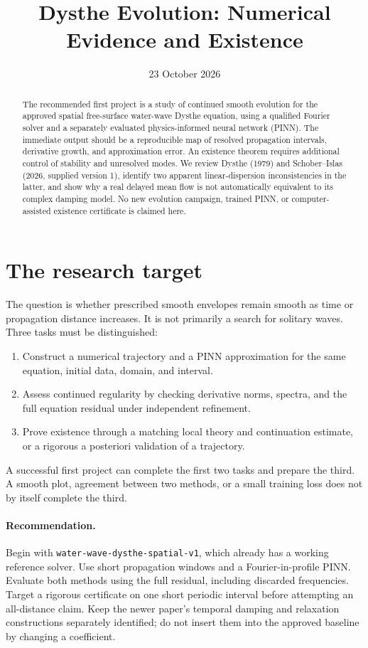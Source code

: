 \documentclass[11pt]{article}
\title{Dysthe Evolution: Numerical Evidence and Existence}
\author{}
\date{23 October 2026}
\begin{document}
\maketitle
\begin{abstract}
The recommended first project is a study of continued smooth evolution
for the approved spatial free-surface water-wave Dysthe equation, using
a qualified Fourier solver and a separately evaluated physics-informed
neural network (PINN). The immediate output should be a reproducible map
of resolved propagation intervals, derivative growth, and approximation
error. An existence theorem requires additional control of stability
and unresolved modes. We review Dysthe (1979) and Schober--Islas (2026,
supplied version 1), identify two apparent linear-dispersion
inconsistencies in the latter, and show why a real delayed mean flow is
not automatically equivalent to its complex damping model.
No new evolution campaign, trained PINN, or computer-assisted existence
certificate is claimed here.
\end{abstract}

\section{The research target}
The question is whether prescribed smooth envelopes remain smooth as
time or propagation distance increases. It is not primarily a search
for solitary waves. Three tasks must be distinguished:
\begin{enumerate}
\item Construct a numerical trajectory and a PINN approximation for the
same equation, initial data, domain, and interval.
\item Assess continued regularity by checking derivative norms, spectra,
and the full equation residual under independent refinement.
\item Prove existence through a matching local theory and continuation
estimate, or a rigorous a posteriori validation of a trajectory.
\end{enumerate}
A successful first project can complete the first two tasks and prepare
the third. A smooth plot, agreement between two methods, or a small
training loss does not by itself complete the third.

\paragraph{Recommendation.}
Begin with \texttt{water-wave-dysthe-spatial-v1}, which already has a
working reference solver. Use short propagation windows and a
Fourier-in-profile PINN. Evaluate both methods using the full residual,
including discarded frequencies. Target a rigorous certificate on one
short periodic interval before attempting an all-distance claim.
Keep the newer paper's temporal damping and relaxation constructions
separately identified; do not insert them into the approved baseline by
changing a coefficient.
\end{document}
